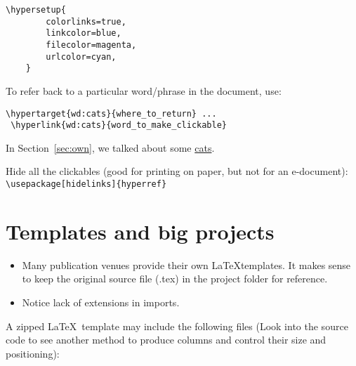 \documentclass[a4paper,11pt]{article}
\begin{document}
\begin{lstlisting}[breaklines]
	\hypersetup{
		colorlinks=true,
		linkcolor=blue,
		filecolor=magenta,      
		urlcolor=cyan,
	}
\end{lstlisting}

To refer back to a particular word/phrase in the document, use: 
\begin{lstlisting}[breaklines]
\hypertarget{wd:cats}{where_to_return} ...
 \hyperlink{wd:cats}{word_to_make_clickable}
\end{lstlisting}

\thispagestyle{empty}\label{pg:empty}

In Section~\ref{sec:own}, we talked about some \hyperlink{wd:random}{cats}.

\bigskip

Hide all the clickables (good for printing on paper, but not for an e-document): \\
\verb|\usepackage[hidelinks]{hyperref}|

\section{Templates and big projects}
\begin{itemize}
	\item Many publication venues provide their own \LaTeX templates. It makes sense to keep the original source file (.tex) in the project folder for reference. 
	\item Notice lack of extensions in imports.
\end{itemize}

A zipped \LaTeX~template may include the following files (Look into the source code to see another method to produce columns and control their size and positioning):

\medskip
\end{document}
